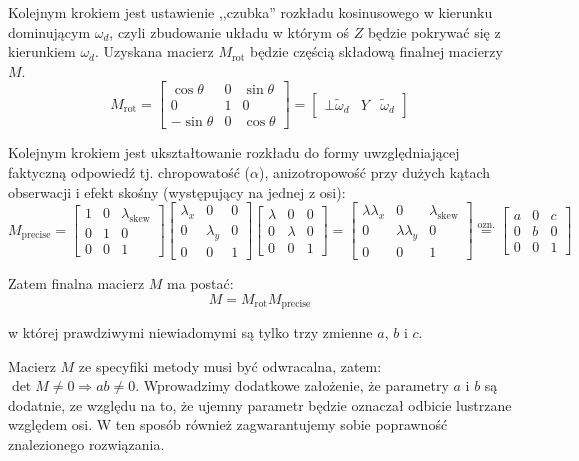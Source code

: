 \documentclass[../main.tex]{subfiles}
\begin{document}
Kolejnym krokiem jest ustawienie ,,czubka'' rozkładu kosinusowego w kierunku
dominującym $\omega_d$, czyli zbudowanie układu w którym oś $Z$ będzie
pokrywać się z kierunkiem $\omega_d$. Uzyskana macierz $M_{\text{rot}}$
będzie częścią składową finalnej macierzy $M$.
\[
M_{\text{rot}} =
\begin{bmatrix}
  \cos\theta  & 0     & \sin\theta \\
  0           & 1     & 0 \\
  -\sin\theta & 0     & \cos\theta
\end{bmatrix}
= \begin{bmatrix}
  \bot {\widetilde{\omega}_d} & Y & \widetilde{\omega}_d
\end{bmatrix}
\]

Kolejnym krokiem jest ukształtowanie rozkładu do formy uwzględniającej
faktyczną odpowiedź tj. chropowatość ($\alpha$), anizotropowość przy
dużych kątach obserwacji i efekt skośny (występujący na jednej z osi):
\[
M_{\text{precise}} =
\begin{bmatrix}
  1 & 0 & \lambda_{\text{skew}} \\
  0 & 1 & 0 \\
  0 & 0 & 1
\end{bmatrix}
\begin{bmatrix}
  \lambda_x & 0 & 0 \\
  0 & \lambda_y & 0 \\
  0 & 0 & 1
\end{bmatrix}
\begin{bmatrix}
  \lambda & 0 & 0 \\
  0 & \lambda & 0 \\
  0 & 0 & 1
\end{bmatrix}
=
\begin{bmatrix}
  \lambda\lambda_x & 0 & \lambda_{\text{skew}} \\
  0 & \lambda\lambda_y & 0 \\
  0 & 0 & 1
\end{bmatrix}
\stackrel{\text{ozn.}}{=}
\begin{bmatrix}
  a & 0 & c \\
  0 & b & 0 \\
  0 & 0 & 1
\end{bmatrix}
\]

Zatem finalna macierz $M$ ma postać:
\[
M = M_{\text{rot}} M_{\text{precise}}
\]

w której prawdziwymi niewiadomymi są tylko trzy zmienne $a$, $b$ i $c$.

Macierz $M$ ze specyfiki metody musi być odwracalna, zatem:
  $\det M \neq 0 \Rightarrow ab \neq 0$.
Wprowadzimy dodatkowe założenie, że parametry $a$ i $b$ są dodatnie, ze względu
na to, że ujemny parametr będzie oznaczał odbicie lustrzane względem osi.
W ten sposób również zagwarantujemy sobie poprawność znalezionego rozwiązania.
\end{document}

